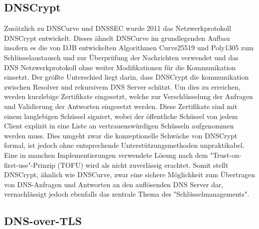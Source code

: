 
\subsection{DNSCrypt}

Zusätzlich zu DNSCurve und DNSSEC wurde 2011 das Netzwerkprotokoll DNSCrypt entwickelt. Dieses ähnelt DNSCurve im grundlegenden Aufbau insofern es die von DJB entwickelten Algorithmen Curve25519 und Poly1305 zum Schlüsselaustausch und zur Überprüfung der Nachrichten verwendet und das DNS Netzwerkprotokoll ohne weiter Modifikationen für die Kommunikation einsetzt. Der größte Unterschied liegt darin, dass DNSCrypt die kommunikation zwischen Resolver und rekursivem DNS Server schützt. Um dies zu erreichen, werden kurzlebige Zertifikate eingesetzt, welche zur Verschlüsselung der Anfragen und Validierung der Antworten eingesetzt werden. Diese Zertifikate sind mit einem langlebigen Schüssel signiert, wobei der öffentliche Schüssel von jedem Client explizit in eine Liste an vertrauenswürdigen Schüsseln aufgenommen werden muss.\cite{Denis2016} Dies umgeht zwar die konzeptionelle Schwäche von DNSCrypt formal, ist jedoch ohne entsprechende Unterstützungsmethoden unpraktikabel. Eine in manchen Implementierungen verwendete Lösung nach dem "Trust-on-first-use"-Prinzip (TOFU) wird als nicht zuverlässig erachtet.\cite{Wendlandt2008} Somit stellt DNSCrypt, ähnlich wie DNSCurve, zwar eine sichere  Möglichkeit zum Übertragen von DNS-Anfragen und Antworten an den auflösenden DNS Server dar, vernachlässigt jedoch ebenfalls das zentrale Thema des "Schlüsselmanagements".    

\subsection{DNS-over-TLS}

